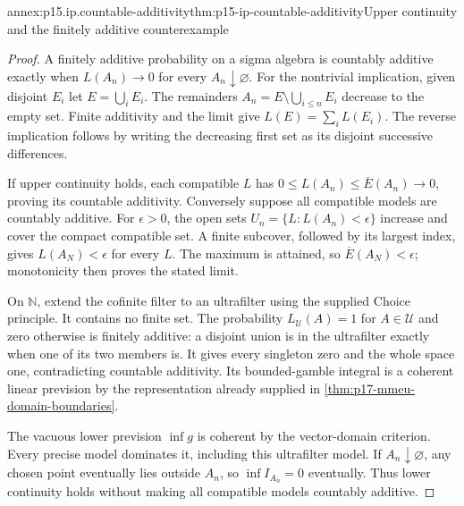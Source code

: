 \begin{annexitem}{annex:p15.ip.countable-additivity}{thm:p15-ip-countable-additivity}{Upper continuity and the finitely additive counterexample}
\begin{proof}
A finitely additive probability on a sigma algebra is countably additive
exactly when \(L(A_n)\to0\) for every \(A_n\downarrow\varnothing\).
For the nontrivial implication, given disjoint \(E_i\) let
\(E=\bigcup_iE_i\). The remainders
\(A_n=E\setminus\bigcup_{i\leq n}E_i\) decrease to the empty set.
Finite additivity and the limit give
\(L(E)=\sum_iL(E_i)\). The reverse implication follows by writing
the decreasing first set as its disjoint successive differences.

If upper continuity holds, each compatible \(L\) has
\(0\leq L(A_n)\leq\overline E(A_n)\to0\), proving its
countable additivity. Conversely suppose all compatible models are
countably additive. For \(\epsilon>0\), the open sets
\(U_n=\{L:L(A_n)<\epsilon\}\) increase and cover the compact
compatible set. A finite subcover, followed by its largest index,
gives \(L(A_N)<\epsilon\) for every \(L\). The maximum is
attained, so \(\overline E(A_N)<\epsilon\); monotonicity then
proves the stated limit.

On \(\mathbb N\), extend the cofinite filter to an ultrafilter
using the supplied Choice principle. It contains no finite set.
The probability \(L_{\mathcal U}(A)=1\) for \(A\in\mathcal U\)
and zero otherwise is finitely additive: a disjoint union is in the
ultrafilter exactly when one of its two members is. It gives every
singleton zero and the whole space one, contradicting countable
additivity. Its bounded-gamble integral is a coherent linear prevision
by the representation already supplied in
\cref{thm:p17-mmeu-domain-boundaries}.

The vacuous lower prevision \(\inf g\) is coherent by the vector-domain
criterion. Every precise model dominates it, including this ultrafilter
model. If \(A_n\downarrow\varnothing\), any chosen point eventually
lies outside \(A_n\), so \(\inf I_{A_n}=0\) eventually.
Thus lower continuity holds without making all compatible models
countably additive.
\end{proof}
\end{annexitem}

